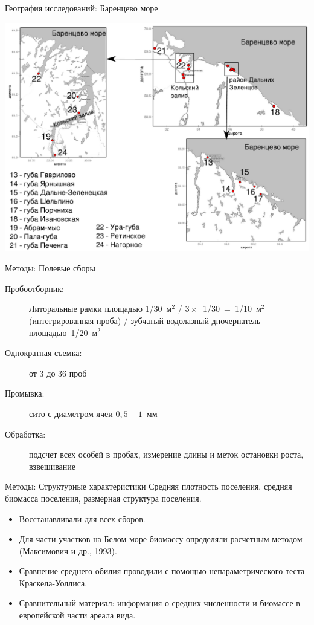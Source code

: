 \documentclass{beamer}
\begin{document}
\begin{frame}{География исследований: Баренцево море}
 \begin{center}
	\includegraphics[height=.8\textheight]{./Barents_sea.pdf}
 \end{center}
\end{frame}

\begin{frame}{Методы: Полевые сборы}
 \begin{description}
 		\item [Пробоотборник:] Литоральные рамки площадью 1/30~м$^2$ / $3 \times$~1/30~=~1/10~м$^2$ (интегрированная проба) / зубчатый водолазный дночерпатель площадью~1/20~м$^2$
		\item [Однократная съемка:] от 3 до 36 проб
		\item [Промывка:] сито с диаметром ячеи $0,5 - 1$~мм 
		\item [Обработка:] подсчет всех особей в пробах, измерение длины и меток остановки роста, взвешивание
	\end{description}
\end{frame}

\begin{frame}{Методы: Структурные характеристики}
Средняя плотность поселения, средняя биомасса поселения, размерная структура поселения.
	\begin{itemize}
		\item Восстанавливали для всех сборов.
		\item Для части участков на Белом море биомассу определяли расчетным методом (Максимович и др., 1993).
		\item Сравнение среднего обилия проводили с помощью непараметрического теста Краскела-Уоллиса.
		\item Сравнительный материал: информация о средних численности и биомассе в европейской части ареала вида.
	\end{itemize}
\end{frame}
\end{document}
